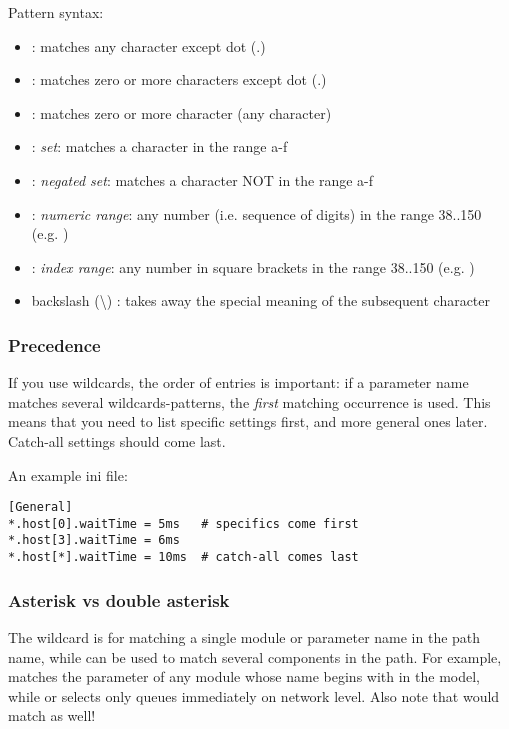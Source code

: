 Pattern syntax:

\begin{itemize}
  \item {} : matches any character except dot (.)
  \item \ttt{*} : matches zero or more characters except dot (.)
  \item \ttt{**} : matches zero or more character (any character)
  \item {} : \textit{set}: matches a character in the range a-f
  \item {}: \textit{negated set}: matches a character
    NOT in the range a-f
  \item {} : \textit{numeric range}: any number (i.e. sequence of digits)
    in the range 38..150  (e.g. )
  \item \ttt{[38..150]} : \textit{index range}: any number in square brackets in the
    range 38..150 (e.g. \ttt{[99]})
  \item backslash ({\textbackslash}) : takes away the special meaning of the
    subsequent character
\end{itemize}

\subsubsection{Precedence}

If you use wildcards, the order of entries is important: if a parameter
name matches several wildcards-patterns, the \textit{first} matching occurrence
is used. This means that you need to list specific settings first, and
more general ones later. Catch-all settings should come last.

An example ini file:

\begin{verbatim}
[General]
*.host[0].waitTime = 5ms   # specifics come first
*.host[3].waitTime = 6ms
*.host[*].waitTime = 10ms  # catch-all comes last
\end{verbatim}


\subsubsection{Asterisk vs double asterisk}

The \ttt{*} wildcard is for matching a single module or parameter name in the
path name, while \ttt{**} can be used to match several components in the path.
For example,  matches the  parameter of any module
whose name begins with  in the model, while 
or  selects only queues immediately on network level.
Also note that  would match 
as well!

